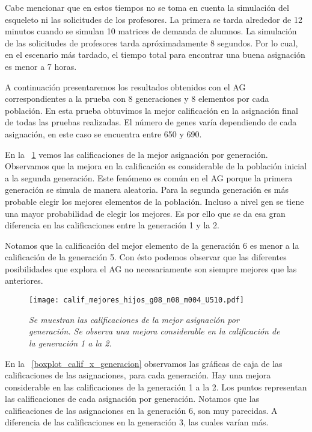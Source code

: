 Cabe mencionar que en estos tiempos no se toma en cuenta la simulación del esqueleto ni las solicitudes de los profesores. La primera se tarda alrededor de 12 minutos cuando se simulan 10 matrices de demanda de alumnos. La simulación de las solicitudes de profesores tarda apróximadamente 8 segundos. Por lo cual, en el escenario más tardado, el tiempo total para encontrar una buena asignación es menor a 7 horas. %


A continuación presentaremos los resultados obtenidos con el AG correspondientes a la prueba con 8 generaciones y 8 elementos por cada población. En esta prueba obtuvimos la mejor calificación en la asignación final de todas las pruebas realizadas. El número de genes varía dependiendo de cada asignación, en este caso se encuentra entre 650 y 690.


En la \figurename{~\ref{EjcalifMejoresHijos}} vemos las calificaciones de la mejor asignación por generación. Observamos que la mejora en la calificación es considerable de la población inicial a la segunda generación. Este fenómeno es común en el AG porque la primera generación se simula de manera aleatoria. Para la segunda generación es más probable elegir los mejores elementos de la población. Incluso a nivel gen se tiene una mayor probabilidad de elegir los mejores. Es por ello que se da esa gran diferencia en las calificaciones entre la generación 1 y la 2.

Notamos que la calificación del mejor elemento de la generación 6 es menor a la calificación de la generación 5. Con ésto podemos observar que las diferentes posibilidades que explora el AG no necesariamente son siempre mejores que las anteriores.


\begin{figure}[H]
\centering
\texttt{[image: calif\_mejores\_hijos\_g08\_n08\_m004\_U510.pdf]} %
\caption[\textit{Calificaciones de las mejores asignaciones por generación}]{\textit{Se muestran las calificaciones de la mejor asignación por generación. Se observa una mejora considerable en la calificación de la generación 1 a la 2.}}\label{EjcalifMejoresHijos}
\end{figure}

En la \figurename{~\ref{boxplot_calif_x_generacion}} observamos las gráficas de caja de las calificaciones de las asignaciones, para cada generación. Hay una mejora considerable en las calificaciones de la generación 1 a la 2. Los puntos representan las calificaciones de cada asignación por generación. Notamos que las calificaciones de las asignaciones en la generación 6, son muy parecidas. A diferencia de las calificaciones en la generación 3, las cuales varían más.

